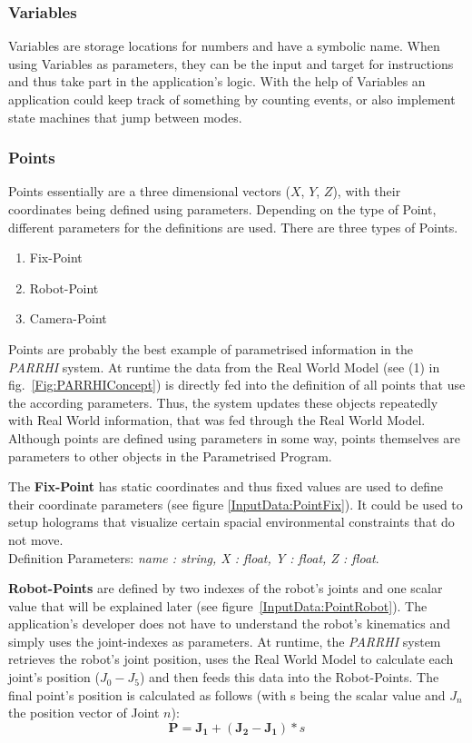 \subsubsection{Variables}\label{Section:Variables}
Variables are storage locations for numbers and have a symbolic name. When using Variables as parameters, they can be the input and target for instructions and thus take part in the application's logic. With the help of Variables an application could keep track of something by counting events, or also implement state machines that jump between modes.

\subsubsection{Points}\label{Section:Points}
 
Points essentially are a three dimensional vectors ($X$, $Y$, $Z$), with their coordinates being defined using parameters. Depending on the type of Point, different parameters for the definitions are used. There are three types of Points.
\begin{enumerate}
	\setlength\itemsep{-1em}
	\item Fix-Point
	\item Robot-Point
	\item Camera-Point
\end{enumerate}

Points are probably the best example of parametrised information in the \textit{PARRHI} system. At runtime the data from the Real World Model (see (1) in fig.~\ref{Fig:PARRHIConcept}) is directly fed into the definition of all points that use the according parameters. Thus, the system updates these objects repeatedly with Real World information, that was fed through the Real World Model. Although points are defined using parameters in some way, points themselves are parameters to other objects in the Parametrised Program.

The \textbf{Fix-Point} has static coordinates and thus fixed values are used to define their coordinate parameters (see figure \ref{InputData:PointFix}). It could be used to setup holograms that visualize certain spacial environmental constraints that do not move.\\Definition Parameters: \textit{name : string, X : float, Y : float, Z : float}.

\textbf{Robot-Points} are defined by two indexes of the robot's joints and one scalar value that will be explained later (see figure~\ref{InputData:PointRobot}). The application's developer does not have to understand the robot's kinematics and simply uses the joint-indexes as parameters. At runtime, the \textit{PARRHI} system retrieves the robot's joint position, uses the Real World Model to calculate each joint's position ($J_0 - J_5$) and then feeds this data into the Robot-Points. The final point's position is calculated as follows (with s being the scalar value and $J_n$ the position vector of Joint $n$):
\begin{equation}
\boldsymbol{P} = \boldsymbol{J_1} + (\boldsymbol{J_2}-\boldsymbol{J_1}) * s
\end{equation}

